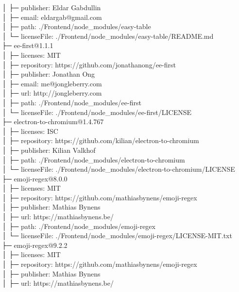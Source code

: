 \documentclass[
    paper=a4,
    twoside=false,
    parskip=half,
    listof=entryprefix,
    listof=totoc,
    index=totoc,
    bibliography=totoc,
    headsepline,
]{scrbook}
\begin{document}
    │  ├─ publisher: Eldar Gabdullin\\
    │  ├─ email: eldargab@gmail.com\\
    │  ├─ path: ./Frontend/node\_modules/easy-table\\
    │  └─ licenseFile: ./Frontend/node\_modules/easy-table/README.md\\
    ├─ ee-first@1.1.1\\
    │  ├─ licenses: MIT\\
    │  ├─ repository: https://github.com/jonathanong/ee-first\\
    │  ├─ publisher: Jonathan Ong\\
    │  ├─ email: me@jongleberry.com\\
    │  ├─ url: http://jongleberry.com\\
    │  ├─ path: ./Frontend/node\_modules/ee-first\\
    │  └─ licenseFile: ./Frontend/node\_modules/ee-first/LICENSE\\
    ├─ electron-to-chromium@1.4.767\\
    │  ├─ licenses: ISC\\
    │  ├─ repository: https://github.com/kilian/electron-to-chromium\\
    │  ├─ publisher: Kilian Valkhof\\
    │  ├─ path: ./Frontend/node\_modules/electron-to-chromium\\
    │  └─ licenseFile: ./Frontend/node\_modules/electron-to-chromium/LICENSE\\
    ├─ emoji-regex@8.0.0\\
    │  ├─ licenses: MIT\\
    │  ├─ repository: https://github.com/mathiasbynens/emoji-regex\\
    │  ├─ publisher: Mathias Bynens\\
    │  ├─ url: https://mathiasbynens.be/\\
    │  ├─ path: ./Frontend/node\_modules/emoji-regex\\
    │  └─ licenseFile: ./Frontend/node\_modules/emoji-regex/LICENSE-MIT.txt\\
    ├─ emoji-regex@9.2.2\\
    │  ├─ licenses: MIT\\
    │  ├─ repository: https://github.com/mathiasbynens/emoji-regex\\
    │  ├─ publisher: Mathias Bynens\\
    │  ├─ url: https://mathiasbynens.be/\\
\end{document}
